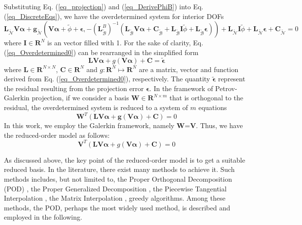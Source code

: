 \documentclass[preprint, 10pt]{elsarticle}
\begin{document}
Substituting Eq. (\ref{eq_projection}) and (\ref{eq_DerivePhiB}) into Eq. (\ref{eq_DiscreteEqs}), we have the overdetermined system for interior
DOFs
\begin{equation}
\mathbf{L}_{\widetilde {\mathcal{N}}} \mathbf{V} \pmb{\alpha}
+\mathbf{g}_{\widetilde {\mathcal{N}}}
\left( \mathbf{V} \pmb{\alpha} + \tilde{\phi} + \pmb{\epsilon}, -\left( \mathbf{L}_{\widetilde {\mathcal{B}}}^{B} \right)^{-1}
\left(
\mathbf{L}_{\widetilde {\mathcal{B}}} \mathbf{V} \pmb{\alpha} +
\mathbf{C}_{\widetilde {\mathcal{B}}} + \mathbf{L}_{\widetilde {\mathcal{B}}} \mathbf{I} \tilde{\phi} + \mathbf{L}_{\widetilde {\mathcal{B}}} \pmb{\epsilon}
\right) \right)
+\mathbf{L}_{\widetilde {\mathcal{N}}} \mathbf{I} \tilde{\phi}
+\mathbf{L}_{\widetilde {\mathcal{N}}} \pmb{\epsilon}
+ \mathbf{C}_{\widetilde {\mathcal{N}}}
= 0
\label{eq_Overdetermined0}
\end{equation}
where $\mathbf{I} \in \mathbf{R}^{N}$ is an vector filled with 1. For the sake of clarity, Eq. (\ref{eq_Overdetermined0}) can be rearranged in the simplified form
\begin{equation}
 \mathbf{L} \mathbf{V} \pmb{\alpha}
+ g         \left( \mathbf{V} \pmb{\alpha} \right)
+\mathbf{C}
= \tilde{ \pmb{\epsilon} }
\label{eq_Overdetermined1}
\end{equation}
where $\mathbf{L} \in \mathbf{R}^{N \times N}$, $\mathbf{C} \in \mathbf{R}^{N}$ and $g: \mathbf{R}^N \mapsto \mathbf{R}^N$ are a matrix, vector and function derived from Eq. (\ref{eq_Overdetermined0}), respectively.
The quantity $\tilde{ \pmb{\epsilon} }$ represent the residual resulting from the projection error $\pmb{\epsilon}$.
In the framework of Petrov-Galerkin projection, if we consider a basis $\mathbf{W} \in \mathbf{R}^{N \times m}$ that is orthogonal to the residual,  the overdetermined system is reduced to a system of $m$ equations
\begin{equation}
\mathbf{W}^T
\left(
 \mathbf{L} \mathbf{V} \pmb{\alpha}
+\mathbf{g} \left( \mathbf{V} \pmb{\alpha} \right)
+\mathbf{C}
\right)
=0
\label{eq_Petrov}
\end{equation}
In this work, we employ the Galerkin framework, namely $\mathbf{W}$=$\mathbf{V}$.
Thus, we have the reduced-order model as follows:
\begin{equation}
\mathbf{V}^T
\left(
 \mathbf{L} \mathbf{V} \pmb{\alpha}
+ g         \left( \mathbf{V} \pmb{\alpha} \right)
+\mathbf{C}
\right)
=0
\label{eq_Galerkin}
\end{equation}

As discussed above, the key point of the reduced-order model is to get a suitable reduced basis. In the literature, there exist many methods to achieve it. Such methods includes, but not limited to, the Proper Orthogonal Decomposition (POD) \cite{hesthaven2016certified,liang2002proper,quarteroni2015reduced}, the  Proper Generalized Decomposition \cite{chinesta2011short}, the Piecewise Tangential Interpolation \cite{gallivan2002model}, the Matrix Interpolation \cite{panzer2010parametric}, greedy algorithms\cite{billaud2017dynamical, lappano2016greedy, hesthaven2014efficient}.
Among these methods, the POD, perhaps the most widely used method, is described and employed in the following.
\end{document}

